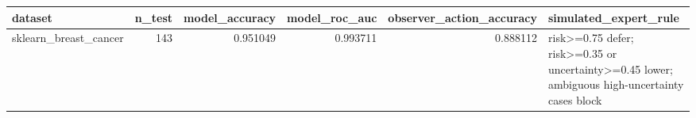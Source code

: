\begin{tabular}{lrrrrl}
\toprule
dataset & n\_test & model\_accuracy & model\_roc\_auc & observer\_action\_accuracy & simulated\_expert\_rule \\
\midrule
sklearn\_breast\_cancer & 143 & 0.951049 & 0.993711 & 0.888112 & risk>=0.75 defer; risk>=0.35 or uncertainty>=0.45 lower; ambiguous high-uncertainty cases block \\
\bottomrule
\end{tabular}
